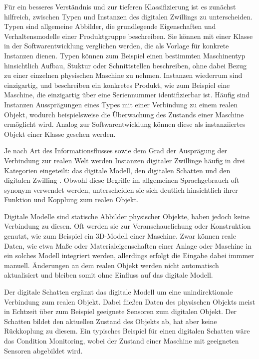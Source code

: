 Für ein besseres Verständnis und zur tieferen Klassifizierung ist es zunächst hilfreich, zwischen Typen und Instanzen des digitalen Zwillings zu unterscheiden.
Typen sind allgemeine Abbilder, die grundlegende Eigenschaften und Verhaltensmodelle einer Produktgruppe beschreiben. 
Sie können mit einer Klasse in der Softwarentwicklung verglichen werden, die als Vorlage für konkrete Instanzen dienen.
Typen können zum Beispiel einen bestimmten Maschinentyp hinsichtlich Aufbau, Stuktur oder Schnittstellen beschreiben, ohne dabei Bezug zu einer einzelnen physischen Maschine zu nehmen.
Instanzen wiederrum sind einzigartig, und beschreiben ein konkretes Produkt, wie zum Beispiel eine Maschine, die einzigartig über eine Seriennummer identifizierbar ist.
Häufig sind Instanzen Aussprägungen eines Types mit einer Verbindung zu einem realen Objekt, wodurch beispielsweise die Überwachung des Zustands einer Maschine ermöglicht wird.
Analog zur Softwarentwicklung können diese als instanziiertes Objekt einer Klasse gesehen werden. \cite{ZEISS}

Je nach Art des Informationsflusses sowie dem Grad der Ausprägung der Verbindung zur realen Welt werden Instanzen digitaler Zwillinge häufig in drei Kategorien eingeteilt: das digitale Modell, den digitalen Schatten und den digitalen Zwilling \cite{ClassificationDT}.
Obwohl diese Begriffe im allgemeinen Sprachgebrauch oft synonym verwendet werden, unterscheiden sie sich deutlich hinsichtlich ihrer Funktion und Kopplung zum realen Objekt.

Digitale Modelle sind statische Abbilder physischer Objekte, haben jedoch keine Verbindung zu diesen. 
Oft werden sie zur Veranschauclichung oder Konstruktion genutzt, wie zum Beispiel ein 3D-Modell einer Maschine.
Zwar können reale Daten, wie etwa Maße oder Materialeigenschaften einer Anlage oder Maschine in ein solches Modell integriert werden, allerdings erfolgt die Eingabe dabei immmer manuell.
Änderungen an dem realen Objekt werden nicht automatisch aktualisiert und bleiben somit ohne Einfluss auf das digitale Modell.

Der digitale Schatten ergänzt das digitale Modell um eine unindirektionale Verbindung zum realen Objekt.
Dabei fließen Daten des physischen Objekts meist in Echtzeit über zum Beispiel geeignete Sensoren zum digitalen Objekt.
Der Schatten bildet den aktuellen Zustand des Objekts ab, hat aber keine Rückkoplung zu diesem.
Ein typisches Beispiel für einen digitalen Schatten wäre das Condition Monitoring, wobei der Zustand einer Maschine mit geeigneten Sensoren abgebildet wird.

